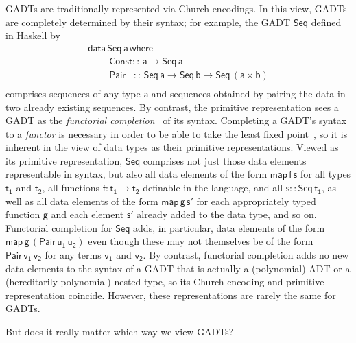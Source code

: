 \documentclass[acmsmall,screen,review,anonymous]{acmart}
\theoremstyle{definition}
\begin{document}
GADTs are traditionally represented via Church encodings. In this
view, GADTs are completely determined by their syntax; for example,
the GADT $\mathsf{Seq}$ defined in Haskell by
\begin{equation}\label{eq:seq}
\begin{array}{l}
\mathsf{data\, Seq\,a\,where}\\
\mathsf{\;\;\;\;\;\;\;\;Const ::\, a \to Seq\,a}\\
\mathsf{\;\;\;\;\;\;\;\;Pair\,\,\,\,\, ::\, Seq \,a \to Seq\,b \to
  Seq\,(a \times b)}\\ 
\end{array}
\end{equation}
\noindent
comprises sequences of any type $\mathsf{a}$ and sequences obtained by
pairing the data in two already existing sequences. By contrast, the
primitive representation sees a GADT as the {\em functorial
  completion}~\cite{jp19} of its syntax. Completing a GADT's syntax to
a {\em functor} is necessary in order to be able to take the least
fixed point~\cite{tfca}, so it is inherent in the view of data types
as their primitive representations. Viewed as its primitive
representation, $\mathsf{Seq}$ comprises not just those data elements
representable in syntax, but also all data elements of the form
$\mathsf{map\,f\,s}$ for all types $\mathsf{t_1}$ and $\mathsf{t_2}$,
all functions $\mathsf{f : t_1 \to t_2}$ definable in the language,
and all $\mathsf{s :: Seq\,t_1}$, as well as all data elements of the
form $\mathsf{map\,g\,s'}$ for each appropriately typed function
$\mathsf{g}$ and each element $\mathsf{s'}$ already added to the data
type, and so on. Functorial completion for $\mathsf{Seq}$ adds, in
particular, data elements of the form
$\mathsf{map\,g\,(Pair\,u_1\,u_2)}$ even though these may not
themselves be of the form $\mathsf{Pair\,v_1\,v_2}$ for any terms
$\mathsf{v_1}$ and $\mathsf{v_2}$. By contrast, functorial completion
adds no new data elements to the syntax of a GADT that is actually a
(polynomial) ADT or a (hereditarily polynomial) nested type, so its
Church encoding and primitive representation coincide. However, these
representations are rarely the same for GADTs.

But does it really matter which way we view GADTs?
\end{document}
